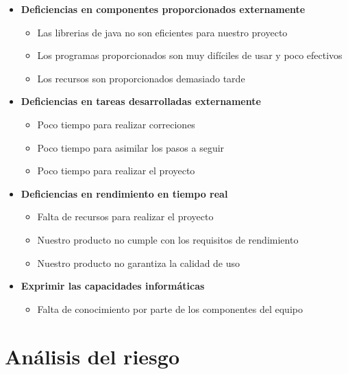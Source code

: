 \documentclass[spanish,a4paper,12pt]{report}	%
\begin{document}
\begin{itemize}
\begin{itemize}
	\end{itemize}
\item \textbf {Deficiencias en componentes proporcionados externamente}
	\begin{itemize}
		\item {Las librerias de java no son eficientes para nuestro proyecto}
		\item {Los programas proporcionados son muy difíciles de usar y poco efectivos}
		\item {Los recursos son proporcionados demasiado tarde}

	\end{itemize}
\item \textbf {Deficiencias en tareas desarrolladas externamente}
	\begin{itemize}
		\item {Poco tiempo para realizar correciones}
		\item {Poco tiempo para asimilar los pasos a seguir}
		\item {Poco tiempo para realizar el proyecto}
	\end{itemize}
\item \textbf {Deficiencias en rendimiento en tiempo real}
	\begin{itemize}
		\item {Falta de recursos para realizar el proyecto}
		\item {Nuestro producto no cumple con los requisitos de rendimiento}
		\item {Nuestro producto no garantiza la calidad de uso}
	\end{itemize}
\item \textbf {Exprimir las capacidades informáticas}
	\begin{itemize}
		\item {Falta de conocimiento por parte de los componentes del equipo}
	\end{itemize}
\end{itemize}


\newpage
\mbox{}
\thispagestyle{empty}						%
\newpage

\part{Análisis del riesgo}
\end{document}
